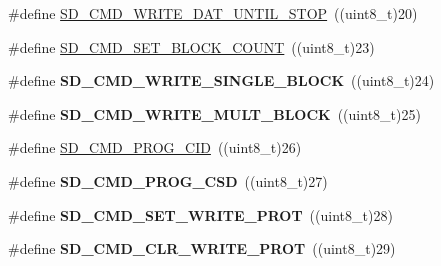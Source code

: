 \begin{DoxyCompactItemize}
\item 
\#define \hyperlink{group___s_t_m324x_g___e_v_a_l___s_d_i_o___s_d___exported___constants_ga6478634540db1fa3fcd044315d1238b5}{S\+D\+\_\+\+C\+M\+D\+\_\+\+W\+R\+I\+T\+E\+\_\+\+D\+A\+T\+\_\+\+U\+N\+T\+I\+L\+\_\+\+S\+T\+OP}~((uint8\+\_\+t)20)
\item 
\#define \hyperlink{group___s_t_m324x_g___e_v_a_l___s_d_i_o___s_d___exported___constants_ga5dd52de3e95163402a5cd995620d4d01}{S\+D\+\_\+\+C\+M\+D\+\_\+\+S\+E\+T\+\_\+\+B\+L\+O\+C\+K\+\_\+\+C\+O\+U\+NT}~((uint8\+\_\+t)23)
\item 
\#define {\bfseries S\+D\+\_\+\+C\+M\+D\+\_\+\+W\+R\+I\+T\+E\+\_\+\+S\+I\+N\+G\+L\+E\+\_\+\+B\+L\+O\+CK}~((uint8\+\_\+t)24)\hypertarget{group___s_t_m324x_g___e_v_a_l___s_d_i_o___s_d___exported___constants_ga20a1c8427ec19835fe2782ec8febd5ca}{}\label{group___s_t_m324x_g___e_v_a_l___s_d_i_o___s_d___exported___constants_ga20a1c8427ec19835fe2782ec8febd5ca}

\item 
\#define {\bfseries S\+D\+\_\+\+C\+M\+D\+\_\+\+W\+R\+I\+T\+E\+\_\+\+M\+U\+L\+T\+\_\+\+B\+L\+O\+CK}~((uint8\+\_\+t)25)\hypertarget{group___s_t_m324x_g___e_v_a_l___s_d_i_o___s_d___exported___constants_gafe82a884b2692654c9862bb25b8706ce}{}\label{group___s_t_m324x_g___e_v_a_l___s_d_i_o___s_d___exported___constants_gafe82a884b2692654c9862bb25b8706ce}

\item 
\#define \hyperlink{group___s_t_m324x_g___e_v_a_l___s_d_i_o___s_d___exported___constants_gae4c3d35575ecc87fb571f2bfb80f3847}{S\+D\+\_\+\+C\+M\+D\+\_\+\+P\+R\+O\+G\+\_\+\+C\+ID}~((uint8\+\_\+t)26)
\item 
\#define {\bfseries S\+D\+\_\+\+C\+M\+D\+\_\+\+P\+R\+O\+G\+\_\+\+C\+SD}~((uint8\+\_\+t)27)\hypertarget{group___s_t_m324x_g___e_v_a_l___s_d_i_o___s_d___exported___constants_gaf911e3c602583e43e3bc16def5feebfc}{}\label{group___s_t_m324x_g___e_v_a_l___s_d_i_o___s_d___exported___constants_gaf911e3c602583e43e3bc16def5feebfc}

\item 
\#define {\bfseries S\+D\+\_\+\+C\+M\+D\+\_\+\+S\+E\+T\+\_\+\+W\+R\+I\+T\+E\+\_\+\+P\+R\+OT}~((uint8\+\_\+t)28)\hypertarget{group___s_t_m324x_g___e_v_a_l___s_d_i_o___s_d___exported___constants_ga7a35e2c3f9d6237bf7a3577225d077d8}{}\label{group___s_t_m324x_g___e_v_a_l___s_d_i_o___s_d___exported___constants_ga7a35e2c3f9d6237bf7a3577225d077d8}

\item 
\#define {\bfseries S\+D\+\_\+\+C\+M\+D\+\_\+\+C\+L\+R\+\_\+\+W\+R\+I\+T\+E\+\_\+\+P\+R\+OT}~((uint8\+\_\+t)29)\hypertarget{group___s_t_m324x_g___e_v_a_l___s_d_i_o___s_d___exported___constants_gac1c159cda7e89dfc085ac66e90790a56}{}\label{group___s_t_m324x_g___e_v_a_l___s_d_i_o___s_d___exported___constants_gac1c159cda7e89dfc085ac66e90790a56}


\end{DoxyCompactItemize}
